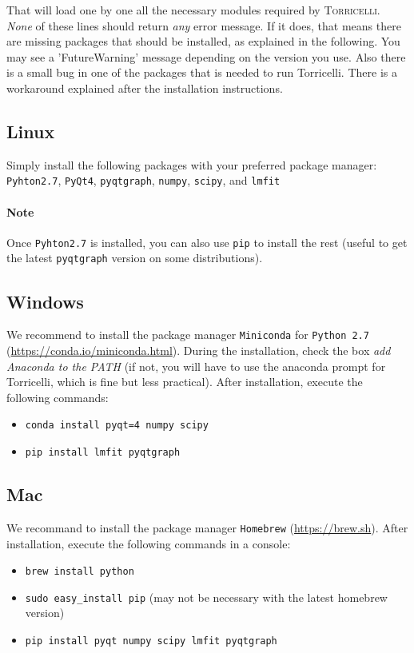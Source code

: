 \documentclass[oldfontcommands,openany,oneside]{memoir}
\begin{document}
That will load one by one all the necessary modules required by \textsc{Torricelli}. \emph{None} of these lines should return \emph{any} error message. If it does, that means there are missing packages that should be installed, as explained in the following. You may see a 'FutureWarning' message depending on the version you use. Also there is a small bug in one of the packages that is needed to run Torricelli. There is a workaround explained after the installation instructions.

\subsection{Linux}
Simply install the following packages with your preferred package manager: \verb+Pyhton2.7+,  \verb+PyQt4+,  \verb+pyqtgraph+, \verb+numpy+, \verb+scipy+, and \verb+lmfit+

\paragraph{Note} Once \verb+Pyhton2.7+ is installed, you can also use \verb+pip+ to install the rest (useful to get the latest \verb+pyqtgraph+ version on some distributions). 

\subsection{Windows}
We recommend to install the package manager \verb+Miniconda+  for \verb+Python 2.7+ (\href{https://conda.io/miniconda.html}{https://conda.io/miniconda.html}). During the installation, check the box \emph{add Anaconda to the PATH} (if not, you will have to use the anaconda prompt for Torricelli, which is fine but less practical). After installation, execute the following commands:
\begin{itemize}
\item \texttt{conda install pyqt=4 numpy scipy}
\item \texttt{pip install lmfit pyqtgraph}
\end{itemize}

\subsection{Mac}
We recommand to install the package manager \texttt{Homebrew} (\href{https://brew.sh}{https://brew.sh}). After installation, execute the following commands in a console:
\begin{itemize}
\item \texttt{brew install python}
\item \texttt{sudo easy\_install pip} (may not be necessary with the latest homebrew version)
\item \texttt{pip install pyqt numpy scipy lmfit pyqtgraph}
\end{itemize}
\end{document}
